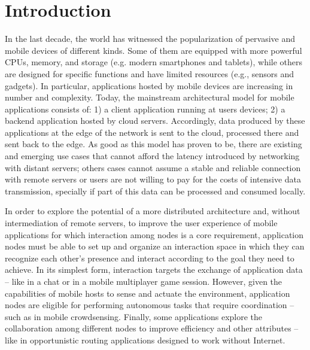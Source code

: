 \section{Introduction}
\label{sec:intro}


In the last decade, the world has witnessed the popularization of pervasive and mobile devices of different kinds. Some of them are equipped with more powerful CPUs, memory, and storage (e.g. modern smartphones and tablets), while others are designed for specific functions and have limited resources (e.g., sensors and gadgets). In particular, applications hosted by mobile devices are increasing in number and complexity. Today, the mainstream architectural model for mobile applications consists of: 1) a client application running at users devices; 2) a backend application hosted by cloud servers. Accordingly, data produced by these applications at the edge of the network is sent to the cloud, processed there and sent back to the edge. As good as this model has proven to be, there are existing and emerging use cases that cannot afford the latency introduced by networking with distant servers; others cases cannot assume a stable and reliable connection with remote servers or users are not willing to pay for the costs of intensive data transmission, specially if part of this data can be processed and consumed locally. 

In order to explore the potential of a more distributed architecture and, without intermediation of remote servers, to improve the user experience of mobile applications for which interaction among nodes is a core requirement, application nodes must be able to set up and organize an interaction space in which they can recognize each other's presence and interact according to the goal they need to achieve. In its simplest form, interaction targets the exchange of application data -- like in a chat or in a mobile multiplayer game session. However, given the capabilities of mobile hosts to sense and actuate the environment, application nodes are eligible for performing autonomous tasks that require coordination -- such as in mobile crowdsensing. Finally, some applications explore the collaboration among different nodes to improve efficiency and other attributes -- like in opportunistic routing applications designed to work without Internet.


